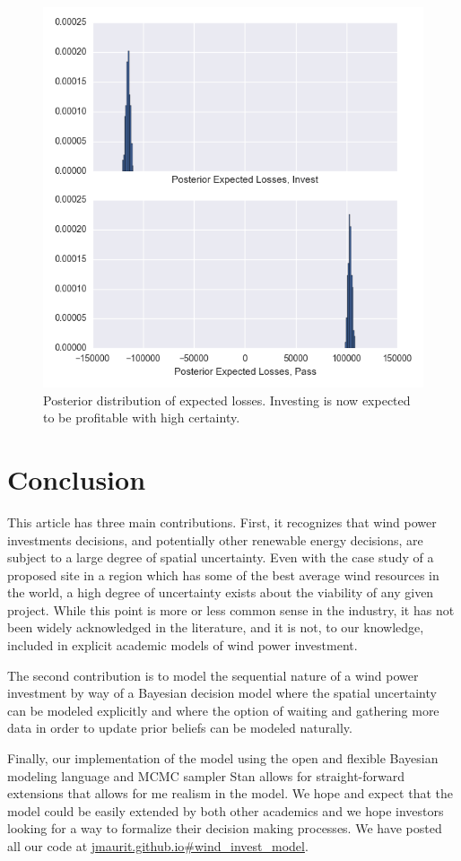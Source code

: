\documentclass[11pt]{article}
\begin{document}
\begin{figure}
	\centering
	\includegraphics[width=.8\textwidth]{figures/post_losses.png}
	\caption{Posterior distribution of expected losses. Investing is now expected to be profitable with high certainty.}
	\label{post_losses}
\end{figure}


\section{Conclusion}
This article has three main contributions. First, it recognizes that wind power investments decisions, and potentially other renewable energy decisions, are subject to a large degree of spatial uncertainty. Even with the case study of a proposed site in a region which has some of the best average wind resources in the world, a high degree of uncertainty exists about the viability of any given project. While this point is more or less common sense in the industry, it has not been widely acknowledged in the literature, and it is not, to our knowledge, included in explicit academic models of wind power investment. 

The second contribution is to model the sequential nature of a wind power investment by way of a Bayesian decision model where the spatial uncertainty can be modeled explicitly and where the option of waiting and gathering more data in order to update prior beliefs can be modeled naturally. 

Finally, our implementation of the model using the open and flexible Bayesian modeling language and MCMC sampler Stan allows for straight-forward extensions that allows for me realism in the model. We hope and expect that the model could be easily extended by both other academics and we hope investors looking for a way to formalize their decision making processes.  We have posted all our code at \url{jmaurit.github.io#wind_invest_model}.
 
\begin{spacing}{1}


\end{spacing}
\end{document}
